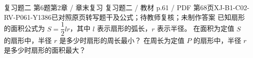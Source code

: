 \par\noindent\begin{minipage}{\linewidth}
\begin{bankitem}{复习题二 第6题}{第2章 / 章末复习 复习题二 / 教材 p.61 / PDF 第68页}{XJ-B1-C02-RV-P061-Y1386}{已对照原页转写题干及公式；待教师复核；未制作答案}
已知扇形的面积公式为 $S=\dfrac12lr$，其中 $l$ 表示扇形的弧长，$r$ 表示半径。
在面积为定值 $S$ 的扇形中，半径 $r$ 是多少时扇形的周长最小？
在周长为定值 $P$ 的扇形中，半径 $r$ 是多少时扇形的面积最大？
\end{bankitem}
\end{minipage}\par\medskip
